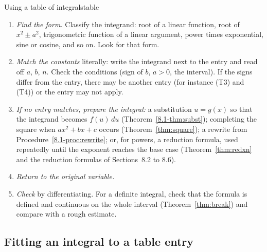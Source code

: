 \documentclass[11pt]{article}
\begin{document}
\begin{proc}{Using a table of integrals}{table}
\begin{enumerate}[nosep]
  \item \emph{Find the form.} Classify the integrand: root of a linear function, root of $x^2\pm a^2$, trigonometric function of a linear argument, power times exponential, sine or cosine, and so on. Look for that form.
  \item \emph{Match the constants} literally: write the integrand next to the entry and read off $a$, $b$, $n$. Check the conditions (sign of $b$, $a>0$, the interval). If the signs differ from the entry, there may be another entry (for instance (T3) and (T4)) or the entry may not apply.
  \item \emph{If no entry matches, prepare the integral:} a substitution $u=g(x)$ so that the integrand becomes $f(u)\,du$ (Theorem~\ref{8.1-thm:subst}); completing the square when $ax^2+bx+c$ occurs (Theorem~\ref{thm:square}); a rewrite from Procedure~\ref{8.1-proc:rewrite}; or, for powers, a reduction formula, used repeatedly until the exponent reaches the base case (Theorem~\ref{thm:redxn} and the reduction formulas of Sections~8.2 to 8.6).
  \item \emph{Return to the original variable.}
  \item \emph{Check} by differentiating. For a definite integral, check that the formula is defined and continuous on the whole interval (Theorem~\ref{thm:break}) and compare with a rough estimate.
\end{enumerate}
\end{proc}

\subsection*{Fitting an integral to a table entry}
\end{document}
